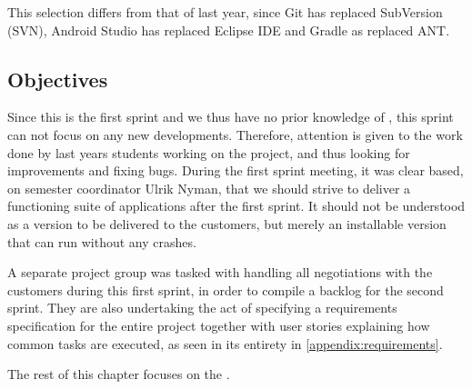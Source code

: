 This selection differs from that of last year, since Git has replaced SubVersion (SVN), Android Studio has replaced Eclipse IDE and Gradle as replaced ANT.

\subsection{Objectives}\label{sec:sprint1:objectives}
Since this is the first sprint and we thus have no prior knowledge of \giraf, this sprint can not focus on any new developments.
Therefore, attention is given to the work done by last years students working on the project, and thus looking for improvements and fixing bugs.
During the first sprint meeting, it was clear based, on semester coordinator Ulrik Nyman, that we should strive to deliver a functioning suite of applications after the first sprint.
It should not be understood as a version to be delivered to the customers, but merely an installable version that can run without any crashes. 

A separate project group was tasked with handling all negotiations with the customers during this first sprint, in order to compile a backlog for the second sprint.
They are also undertaking the act of specifying a requirements specification for the entire project together with user stories explaining how common tasks are executed, as seen in its entirety in \cref{appendix:requirements}.

The rest of this chapter focuses on the \launcher.